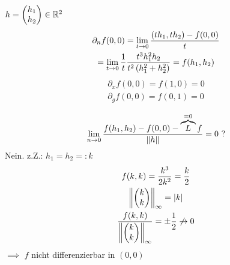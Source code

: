 \begin{Bsp}
  $h=\begin{pmatrix}h_1\\h_2\end{pmatrix}\in\mathbb{R}^2$
  \begin{gather*}
    \partial_nf(0,0)=\displaystyle\lim_{t\rightarrow0}\frac{\left( th_1,th_2 \right)-f(0,0)}{t}\\
    =\displaystyle\lim_{t\rightarrow0}\frac{1}{t}\frac{t^3h^2_1h_2}{t^2\left( h_1^2+h_2^2 \right)}=f(h_1,h_2)
  \end{gather*}
  \begin{gather*}
    \partial_xf(0,0)=f(1,0)=0\\
    \partial_gf(0,0)=f(0,1)=0\\
  \end{gather*}
  \[\Limo{n}\frac{f(h_1,h_2)-f(0,0)-\overbrace{L}^{=0}f}{\Norm{h}}=0\ ?\]
  Nein. z.Z.: $h_1=h_2=:k$
  \begin{gather*}
    f(k,k)=\frac{k^3}{2k^2}=\frac{k}{2}\\
    \left\| \begin{pmatrix}k\\k\end{pmatrix} \right\|_\infty=\left| k \right|\\
    \frac{f(k,k)}{\left\| \begin{pmatrix}k\\k\end{pmatrix} \right\|_\infty}=\pm\frac{1}{2}\not\to 0
  \end{gather*}
  $\implies$ $f$ nicht differenzierbar in $(0,0)$
\end{Bsp}
